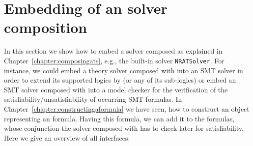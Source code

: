 \chapter{Embedding of an \smtrat solver composition}
\label{chapter:embedding}
In this section we show how to embed a solver composed as explained
in Chapter~\ref{chapter:composingats}, e.g., the built-in 
solver \texttt{NRATSolver}. For instance, we could embed a theory solver composed with \smtrat 
into an SMT solver in order to extend its supported logics by \supportedLogics (or any of its sub-logics) 
or embed an SMT solver composed with \smtrat into a model checker for the verification of the 
satisfiability/unsatisfiability of occurring SMT formulas. In Chapter~\ref{chapter:constructingaformula}
we have seen, how to construct an object representing an \supportedLogics formula. Having this formula,
we can add it to the formulas, whose conjunction the solver composed with \smtrat has to check later
for satisfiability. Here we give an overview of all interfaces:

